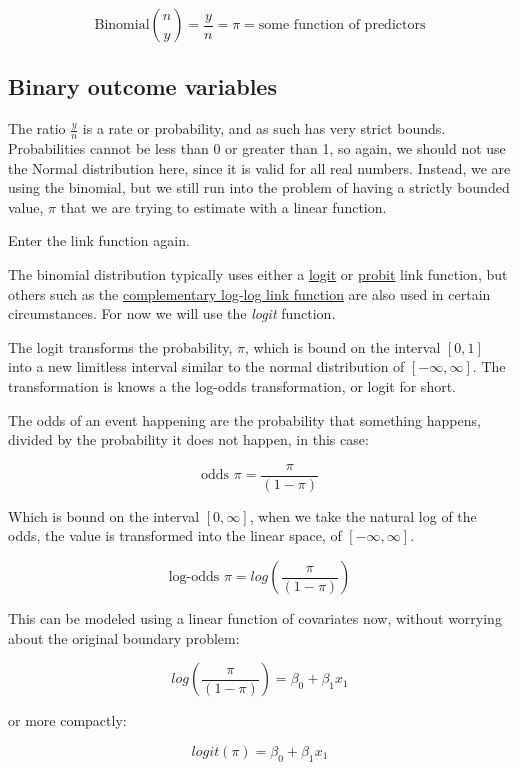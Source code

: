 \documentclass[
]{article}
\begin{document}
\[\text{Binomial} \binom{n}{y} = \frac{y}{n} = \pi = \text{some function of predictors}\]

\hypertarget{binary-outcome-variables}{%
\subsection{Binary outcome variables}\label{binary-outcome-variables}}

The ratio \(\frac{y}{n}\) is a rate or probability, and as such has very strict bounds. Probabilities cannot be less than 0 or greater than 1, so again, we should not use the Normal distribution here, since it is valid for all real numbers. Instead, we are using the binomial, but we still run into the problem of having a strictly bounded value, \(\pi\) that we are trying to estimate with a linear function.

Enter the link function again.

The binomial distribution typically uses either a \href{https://en.wikipedia.org/wiki/Logit}{logit} or \href{https://en.wikipedia.org/wiki/Probit}{probit} link function, but others such as the \href{http://data.princeton.edu/wws509/notes/c3s7.html}{complementary log-log link function} are also used in certain circumstances. For now we will use the \emph{logit} function.

The logit transforms the probability, \(\pi\), which is bound on the interval \([0,1]\) into a new limitless interval similar to the normal distribution of \([-\infty, \infty]\). The transformation is knows a the log-odds transformation, or logit for short.

The odds of an event happening are the probability that something happens, divided by the probability it does not happen, in this case:

\[\text{odds }{\pi} = \frac{\pi}{(1-\pi)}\]

Which is bound on the interval \([0, \infty]\), when we take the natural log of the odds, the value is transformed into the linear space, of \([-\infty, \infty]\).

\[\text{log-odds }{\pi} = log  \left ( \frac{\pi}{(1-\pi)}  \right) \]

This can be modeled using a linear function of covariates now, without worrying about the original boundary problem:

\[log  \left ( \frac{\pi}{(1-\pi)}  \right) = \beta_0 +\beta_1 x_1\]

or more compactly:

\[logit (\pi)  = \beta_0 +\beta_1 x_1\]
\end{document}
